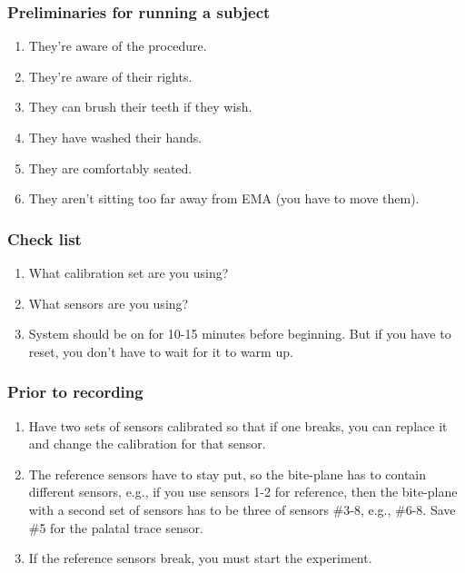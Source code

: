 \documentclass[12pt]{article}
\begin{document}
    \subsubsection{Preliminaries for running a subject}
    \begin{enumerate}
        \item They’re aware of the procedure.
	    \item They’re aware of their rights.
	    \item They can brush their teeth if they wish.
	    \item They have washed their hands.
	    \item They are comfortably seated.
	    \item They aren’t sitting too far away from EMA (you have to move them).
	\end{enumerate}
		
	\subsubsection{Check list}
	\begin{enumerate}
	    \item What calibration set are you using?
	    \item What sensors are you using? 
	    \item System should be on for 10-15 minutes before beginning. But if you have to reset, you don't have to wait for it to warm up.
	\end{enumerate}
	
	\subsubsection{Prior to recording}
	\begin{enumerate}
	    \item Have two sets of sensors calibrated so that if one breaks, you can replace it and change the calibration for that sensor.
	    \item The reference sensors have to stay put, so the bite-plane has to contain different sensors, e.g., if you use sensors 1-2 for reference, then the bite-plane with a second set of sensors has to be three of sensors \#3-8, e.g., \#6-8. Save \#5 for the palatal trace sensor.
	    \item If the reference sensors break, you must start the experiment.
	\end{enumerate}
\end{document}
